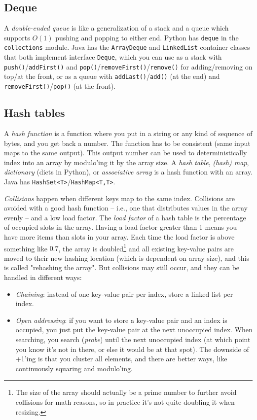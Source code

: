 \documentclass[8pt, table, xcdraw]{article}%
\begin{document}
\subsection{Deque}

A \emph{double-ended queue} is like a generalization of a stack and a queue which supports $O(1)$ pushing and popping to either end. Python has \lstinline{deque} in the \lstinline{collections} module. Java has the \lstinline{ArrayDeque} and \lstinline{LinkedList} container classes that both implement interface \lstinline{Deque}, which you can use as a stack with \lstinline{push()}/\lstinline{addFirst()} and \lstinline{pop()}/\lstinline{removeFirst()}/\lstinline{remove()} for adding/removing on top/at the front, or as a queue with \lstinline{addLast()}/\lstinline{add()} (at the end) and \lstinline{removeFirst()}/\lstinline{pop()} (at the front).

\subsection{Hash tables}

A \emph{hash function} is a function where you put in a string or any kind of sequence of bytes, and you get back a number. The function has to be consistent (same input maps to the same output). This output number can be used to deterministically index into an array by modulo'ing it by the array size. A \emph{hash table}, \emph{(hash) map}, \emph{dictionary} (dicts in Python), or \emph{associative array} is a hash function with an array. Java has \lstinline{HashSet<T>}/\lstinline{HashMap<T,T>}.

\emph{Collisions} happen when different keys map to the same index. Collisions are avoided with a good hash function -- i.e., one that distributes values in the array evenly -- and a low load factor. The \emph{load factor} of a hash table is the percentage of occupied slots in the array. Having a load factor greater than 1 means you have more items than slots in your array. Each time the load factor is above something like $0.7$, the array is doubled\footnote{The size of the array should actually be a prime number to further avoid collisions for math reasons, so in practice it's not quite doubling it when resizing.} and all existing key-value pairs are moved to their new hashing location (which is dependent on array size), and this is called "rehashing the array". But collisions may still occur, and they can be handled in different ways:

\begin{itemize}
    \item \emph{Chaining}: instead of one key-value pair per index, store a linked list per index.
    \item \emph{Open addressing}: if you want to store a key-value pair and an index is occupied, you just put the key-value pair at the next unoccupied index. When searching, you search (\emph{probe}) until the next unoccupied index (at which point you know it's not in there, or else it would be at that spot). The downside of +1'ing is that you cluster all elements, and there are better ways, like continuously squaring and modulo'ing.
\end{itemize}
\end{document}

